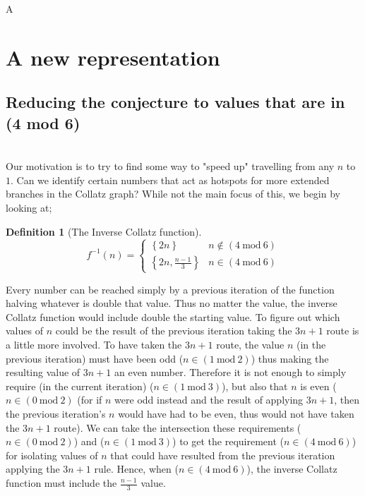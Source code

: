 \documentclass[12pt,a4paper]{amsart}
\numberwithin{equation}{section}
\theoremstyle{plain}
\theoremstyle{definition}
\newtheorem{Def}[Th]{Definition}
\begin{document}
A

\section{A new representation}

\subsection{Reducing the conjecture to values that are in (4 mod 6)} \hfill\\

Our motivation is to try to find some way to "speed up" travelling from any $n$ to $1$. Can we identify certain numbers that act as hotspots for more extended branches in the Collatz graph? While not the main focus of this, we begin by looking at;

\begin{Def}[The Inverse Collatz function]
\begin{equation}
f^{-1} \left ( n \right )=\left\{\begin{matrix}
\left \{ 2n \right \} & n \notin \left ( 4\:\mathrm{mod}\:6 \right ) \\ 
\left \{ 2n, \frac{n-1}{3} \right \} & n \in \left ( 4\:\mathrm{mod}\:6 \right )
\end{matrix}\right.
\end{equation}
\end{Def}

Every number can be reached simply by a previous iteration of the function halving whatever is double that value. Thus no matter the value, the inverse Collatz function would include double the starting value. To figure out which values of $n$ could be the result of the previous iteration taking the $3n+1$ route is a little more involved. To have taken the $3n+1$ route, the value $n$ (in the previous iteration) must have been odd ($n \in \left ( 1\:\mathrm{mod}\:2 \right )$) thus making the resulting value of $3n+1$ an even number. Therefore it is not enough to simply require (in the current iteration) ($n \in \left ( 1\:\mathrm{mod}\:3 \right )$), but also that $n$ is even ($n \in \left ( 0\:\mathrm{mod}\:2 \right )$ (for if $n$ were odd instead and the result of applying $3n+1$, then the previous iteration's $n$ would have had to be even, thus would not have taken the $3n+1$ route). We can take the intersection these requirements ($n \in \left ( 0\:\mathrm{mod}\:2 \right )$) and ($n \in \left ( 1\:\mathrm{mod}\:3 \right )$) to get the requirement ($n \in \left ( 4\:\mathrm{mod}\:6 \right )$) for isolating values of $n$ that could have resulted from the previous iteration applying the $3n+1$ rule. Hence, when ($n \in \left ( 4\:\mathrm{mod}\:6 \right )$), the inverse Collatz function must include the $\frac{n-1}{3}$ value.
\end{document}
